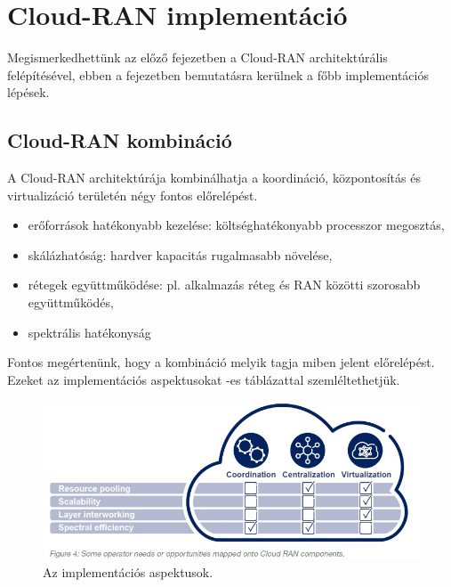 \chapter{Cloud-RAN implementáció}\label{sect:CloudImp}
Megismerkedhettünk az előző fejezetben a Cloud-RAN architektúrális felépítésével, ebben a fejezetben bemutatásra kerülnek a főbb implementációs lépések.\cite{BenefitsEricsson}
\section{Cloud-RAN kombináció}
\hspace{2mm} 
\indent A Cloud-RAN architektúrája kombinálhatja a koordináció, központosítás és virtualizáció területén négy fontos előrelépést.\cite{FutureCarrier} \cite{WirelessFull}
\begin{itemize}
\item erőforrások hatékonyabb kezelése: költséghatékonyabb processzor megosztás,
\item skálázhatóság: hardver kapacitás rugalmasabb növelése,
\item rétegek együttműködése: pl. alkalmazás réteg és RAN közötti szorosabb együttműködés,
\item spektrális hatékonyság
\end{itemize}
Fontos megértenünk, hogy a kombináció melyik tagja miben jelent előrelépést. Ezeket az implementációs aspektusokat -es táblázattal szemléltethetjük.
\begin{figure}[!ht]
\centering
\includegraphics[width=\textwidth, keepaspectratio]{figures/imp_aspects.png}
\caption{Az implementációs aspektusok.} 
\label{fig:imp_aspects}
\end{figure} 
